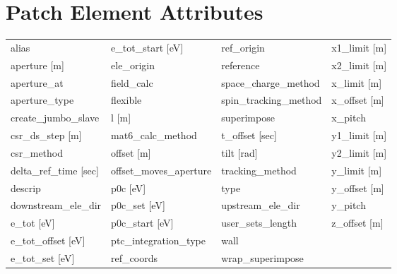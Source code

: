  \section{Patch Element Attributes}
 \label{s:list.patch}
 
 \begin{tabular}{llll} \toprule
alias                            & e_tot_start [eV]                 & ref_origin                       & x1_limit [m]                     \\
aperture [m]                     & ele_origin                       & reference                        & x2_limit [m]                     \\
aperture_at                      & field_calc                       & space_charge_method              & x_limit [m]                      \\
aperture_type                    & flexible                         & spin_tracking_method             & x_offset [m]                     \\
create_jumbo_slave               & l [m]                            & superimpose                      & x_pitch                          \\
csr_ds_step [m]                  & mat6_calc_method                 & t_offset [sec]                   & y1_limit [m]                     \\
csr_method                       & offset [m]                       & tilt [rad]                       & y2_limit [m]                     \\
delta_ref_time [sec]             & offset_moves_aperture            & tracking_method                  & y_limit [m]                      \\
descrip                          & p0c [eV]                         & type                             & y_offset [m]                     \\
downstream_ele_dir               & p0c_set [eV]                     & upstream_ele_dir                 & y_pitch                          \\
e_tot [eV]                       & p0c_start [eV]                   & user_sets_length                 & z_offset [m]                     \\
e_tot_offset [eV]                & ptc_integration_type             & wall                             &                                  \\
e_tot_set [eV]                   & ref_coords                       & wrap_superimpose                 &                                  \\
 \bottomrule
 \end{tabular}
 \vfill
 
